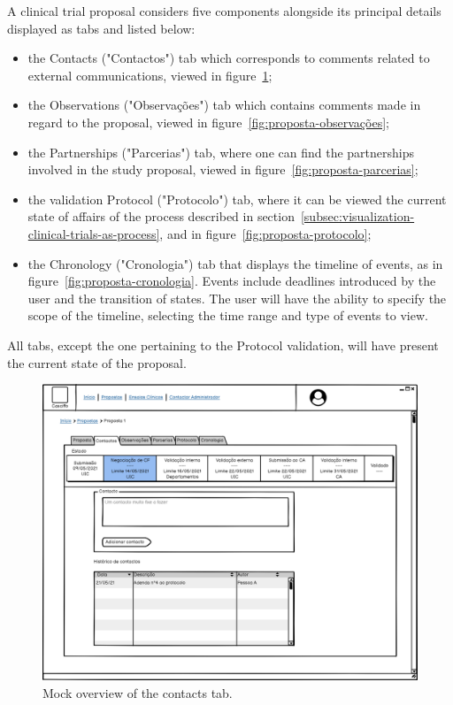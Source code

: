 A clinical trial proposal considers five components alongside its principal details displayed as tabs and listed below: 
\begin{itemize}
    \item the Contacts ("Contactos") tab which corresponds to comments related to external communications, viewed in figure~\ref{fig:proposta-contactos};
    \item the Observations ("Observações") tab which contains comments made in regard to the proposal, viewed in figure~\ref{fig:proposta-observações};
    \item the Partnerships ("Parcerias") tab, where one can find the partnerships involved in the study proposal, viewed in figure~\ref{fig:proposta-parcerias};
    \item the validation Protocol ("Protocolo") tab, where it can be viewed the current state of affairs of the process described in section~\ref{subsec:visualization-clinical-trials-as-process}, and in figure~\ref{fig:proposta-protocolo};
    \item the Chronology ("Cronologia") tab that displays the timeline of events, as in figure~\ref{fig:proposta-cronologia}. Events include deadlines introduced by the user and the transition of states. The user will have the ability to specify the scope of the timeline, selecting the time range and type of events to view. 
\end{itemize}

All tabs, except the one pertaining to the Protocol validation, will have present the current state of the proposal.

\begin{figure}[H]
    \centering
    \includegraphics[scale=0.35]{Chapters/img/propostas/proposta-contactos.png}
    \caption{Mock overview of the contacts tab.}
    \label{fig:proposta-contactos}
\end{figure}

